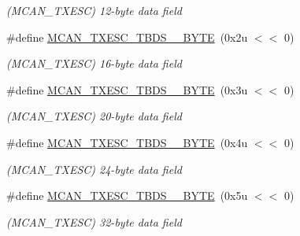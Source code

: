 \begin{DoxyCompactItemize}
\begin{DoxyCompactList}\small\item\em (M\+C\+A\+N\+\_\+\+T\+X\+E\+SC) 12-\/byte data field \end{DoxyCompactList}\item 
\mbox{\label{group__SAMV71__MCAN_gaf4d87fd48f14f9e2800d62e9858aa5c9}} 
\#define \mbox{\hyperlink{group__SAMV71__MCAN_gaf4d87fd48f14f9e2800d62e9858aa5c9}{M\+C\+A\+N\+\_\+\+T\+X\+E\+S\+C\+\_\+\+T\+B\+D\+S\+\_\+\_\+\+B\+Y\+TE}}~(0x2u $<$$<$ 0)
\begin{DoxyCompactList}\small\item\em (M\+C\+A\+N\+\_\+\+T\+X\+E\+SC) 16-\/byte data field \end{DoxyCompactList}\item 
\mbox{\label{group__SAMV71__MCAN_gaa76d9a581f77cd144114581925bf252d}} 
\#define \mbox{\hyperlink{group__SAMV71__MCAN_gaa76d9a581f77cd144114581925bf252d}{M\+C\+A\+N\+\_\+\+T\+X\+E\+S\+C\+\_\+\+T\+B\+D\+S\+\_\+\_\+\+B\+Y\+TE}}~(0x3u $<$$<$ 0)
\begin{DoxyCompactList}\small\item\em (M\+C\+A\+N\+\_\+\+T\+X\+E\+SC) 20-\/byte data field \end{DoxyCompactList}\item 
\mbox{\label{group__SAMV71__MCAN_ga4ac00138bfabb07822a262b23abddfbb}} 
\#define \mbox{\hyperlink{group__SAMV71__MCAN_ga4ac00138bfabb07822a262b23abddfbb}{M\+C\+A\+N\+\_\+\+T\+X\+E\+S\+C\+\_\+\+T\+B\+D\+S\+\_\+\_\+\+B\+Y\+TE}}~(0x4u $<$$<$ 0)
\begin{DoxyCompactList}\small\item\em (M\+C\+A\+N\+\_\+\+T\+X\+E\+SC) 24-\/byte data field \end{DoxyCompactList}\item 
\mbox{\label{group__SAMV71__MCAN_gaf72077eb72d27e669fb1d32f13142f3e}} 
\#define \mbox{\hyperlink{group__SAMV71__MCAN_gaf72077eb72d27e669fb1d32f13142f3e}{M\+C\+A\+N\+\_\+\+T\+X\+E\+S\+C\+\_\+\+T\+B\+D\+S\+\_\+\_\+\+B\+Y\+TE}}~(0x5u $<$$<$ 0)
\begin{DoxyCompactList}\small\item\em (M\+C\+A\+N\+\_\+\+T\+X\+E\+SC) 32-\/byte data field \end{DoxyCompactList}\item 

\end{DoxyCompactItemize}
